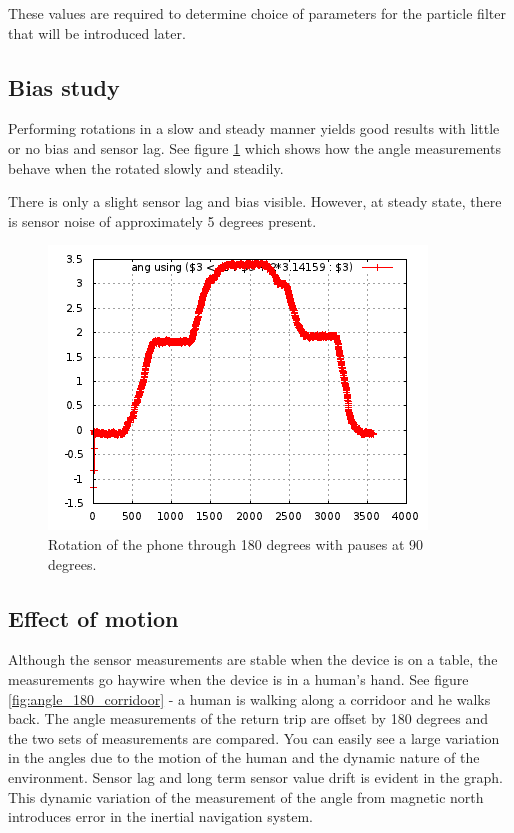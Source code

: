 These values are required to determine choice of parameters for the particle
filter that will be introduced later.

\subsection{Bias study}

Performing rotations in a slow and steady manner yields good results with little
or no bias and sensor lag. See figure \ref{fig:angle_180_rotation_table} which 
shows how the angle measurements behave when the rotated slowly and steadily.

There is only a slight sensor lag and bias visible. However, at steady state,
there is sensor noise of approximately 5 degrees present.

\begin{figure}\centering
    \includegraphics{figures/angle_180_rotation_table.png}
    \caption{Rotation of the phone through 180 degrees with pauses at 90 degrees.\label{fig:angle_180_rotation_table}}
\end{figure}


\subsection{Effect of motion}

Although the sensor measurements are stable when the device is on a table,
the measurements go haywire when the device is in a human's hand. See figure
\ref{fig:angle_180_corridoor} - a human is walking along a corridoor and he walks
back. The angle measurements of the return trip are offset by 180 degrees and
the two sets of measurements are compared. You can easily see a large variation
in the angles due to the motion of the human and the dynamic nature of the environment.
Sensor lag and long term sensor value drift is evident in the graph.
This dynamic variation of the measurement of the angle from magnetic north 
introduces error in the inertial navigation system.

